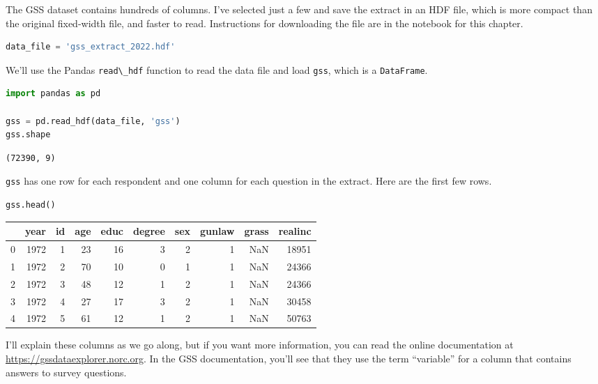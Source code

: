 The GSS dataset contains hundreds of columns. I've selected just a few
and save the extract in an HDF file, which is more compact than the
original fixed-width file, and faster to read. Instructions for
downloading the file are in the notebook for this chapter.

\begin{lstlisting}[language=Python,style=source]
data_file = 'gss_extract_2022.hdf'
\end{lstlisting}

We'll use the Pandas \passthrough{\lstinline!read\_hdf!} function to
read the data file and load \passthrough{\lstinline!gss!}, which is a
\passthrough{\lstinline!DataFrame!}.

\begin{lstlisting}[language=Python,style=source]
import pandas as pd

gss = pd.read_hdf(data_file, 'gss')
gss.shape
\end{lstlisting}

\begin{lstlisting}[style=output]
(72390, 9)
\end{lstlisting}

\passthrough{\lstinline!gss!} has one row for each respondent and one
column for each question in the extract. Here are the first few rows.

\begin{lstlisting}[language=Python,style=source]
gss.head()
\end{lstlisting}

\begin{tabular}{lrrrrrrrrr}
\toprule
 & year & id & age & educ & degree & sex & gunlaw & grass & realinc \\
\midrule
0 & 1972 & 1 & 23 & 16 & 3 & 2 & 1 & NaN & 18951 \\
1 & 1972 & 2 & 70 & 10 & 0 & 1 & 1 & NaN & 24366 \\
2 & 1972 & 3 & 48 & 12 & 1 & 2 & 1 & NaN & 24366 \\
3 & 1972 & 4 & 27 & 17 & 3 & 2 & 1 & NaN & 30458 \\
4 & 1972 & 5 & 61 & 12 & 1 & 2 & 1 & NaN & 50763 \\
\bottomrule
\end{tabular}

I'll explain these columns as we go along, but if you want more
information, you can read the online documentation at
\url{https://gssdataexplorer.norc.org}. In the GSS documentation, you'll
see that they use the term ``variable'' for a column that contains
answers to survey questions.

